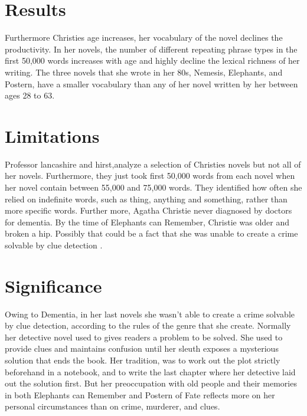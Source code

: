 \documentclass[journal, a4paper]{IEEEtran}
\begin{document}
\section{Results}

Furthermore Christies age increases, her vocabulary of the novel declines the productivity. In her novels, the number of different repeating phrase types in the first 50,000 words increases with age and highly decline the lexical richness of her writing. The three novels that she wrote in her 80s, Nemesis, Elephants, and Postern, have a smaller vocabulary than any of her novel written by her between ages 28 to 63.

\section{Limitations}

Professor lancashire and hirst,analyze a selection of Christies novels but not all of her novels. Furthermore, they just took first 50,000 words from each novel when her novel contain between 55,000 and 75,000 words. They identified how often she relied on indefinite words, such as thing, anything and something, rather than more specific words. Further more, Agatha Christie never diagnosed by doctors for dementia. By the time of Elephants can Remember, Christie was older and broken a hip. Possibly that could be a fact that she was unable to create a crime solvable by clue detection .


\section{Significance}

Owing to Dementia, in her last novels she wasn’t able to create a crime solvable by clue detection, according to the rules of the genre that she create. Normally her detective novel used to gives readers a problem to be solved. She used to provide clues and maintains confusion until her sleuth exposes a mysterious solution that ends the book. Her tradition, was to work out the plot strictly beforehand in a notebook, and to write the last chapter where her detective laid out the solution first. But her preoccupation with old people and their memories in both Elephants can Remember and Postern of Fate reflects more on her personal circumstances than on crime, murderer, and clues.

\end{document}
